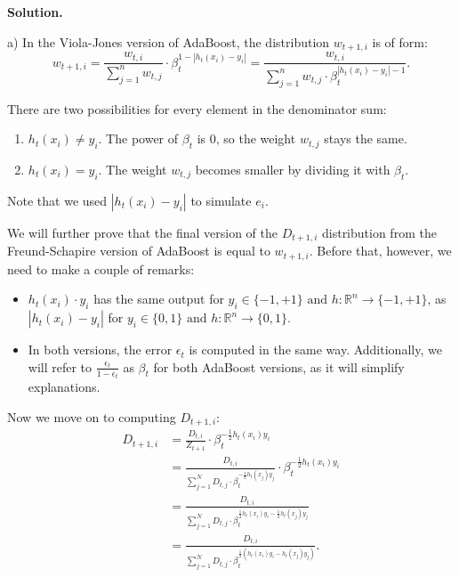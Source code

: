 \documentclass{article}
\newcommand{\<}{\langle}
\renewcommand{\>}{\rangle}
\theoremstyle{definition}
\begin{document}
\textbf{Solution.}

a) In the Viola-Jones version of AdaBoost, the distribution $w_{t+1, i}$ is of form:
$$w_{t+1, i} = \frac{w_{t, i}}{\sum_{j=1}^{n} w_{t, j}} \cdot \beta_t^{1 - |h_t(x_i) - y_i|} = \frac{w_{t, i}}{\sum_{j=1}^{n} w_{t, j} \cdot \beta_t^{|h_t(x_i) - y_i| - 1}}.$$

There are two possibilities for every element in the denominator sum:

\begin{enumerate}
    \item $h_t(x_i) \neq y_i$. The power of $\beta_t$ is 0, so the weight $w_{t,j}$ stays the same.
    \item $h_t(x_i) = y_i$. The weight $w_{t,j}$ becomes smaller by dividing it with $\beta_t$.
\end{enumerate}

Note that we used $|h_t(x_i) - y_i|$ to simulate $e_i$.

We will further prove that the final version of the $D_{t+1,i}$ distribution from the Freund-Schapire version of AdaBoost is equal to $w_{t+1, i}$. Before that, however, we need to make a couple of remarks:

\begin{itemize}
    \item $h_t(x_i)\cdot y_i$ has the same output for $y_i \in \{-1, +1\} \text{ and } h : \mathbb{R}^n \rightarrow \{-1,+1\}$, as $|h_t(x_i) - y_i|$ for $y_i \in \{0, 1\} \text{ and } h : \mathbb{R}^n \rightarrow \{0,1\}$.
    \item In both versions, the error $\epsilon_t$ is computed in the same way. Additionally, we will refer to $\frac{\epsilon_t}{1 - \epsilon_t}$ as $\beta_t$ for both AdaBoost versions, as it will simplify explanations.
\end{itemize}

Now we move on to computing $D_{t+1,i}$:
\[
\begin{aligned}
    D_{t+1, i} & = \frac{D_{t,i}}{Z_{t+1}} \cdot \beta_t^{-\frac{1}{2}h_t(x_i)y_i}\\
    & = \frac{D_{t,i}}{\sum_{j=1}^{N} D_{t,j} \cdot \beta_t^{-\frac{1}{2}h_t(x_j)y_j}} \cdot \beta_t^{-\frac{1}{2}h_t(x_i)y_i} \\
    & = \frac{D_{t,i}}{\sum_{j=1}^{N} D_{t,j} \cdot \beta_t^{\frac{1}{2}h_t(x_i)y_i-\frac{1}{2}h_t(x_j)y_j}}\\ 
    & = \frac{D_{t,i}}{\sum_{j=1}^{N} D_{t,j} \cdot \beta_t^{\frac{1}{2} (h_t(x_i)y_i - h_t(x_j)y_j)}}
    .
\end{aligned}
\]
\end{document}
